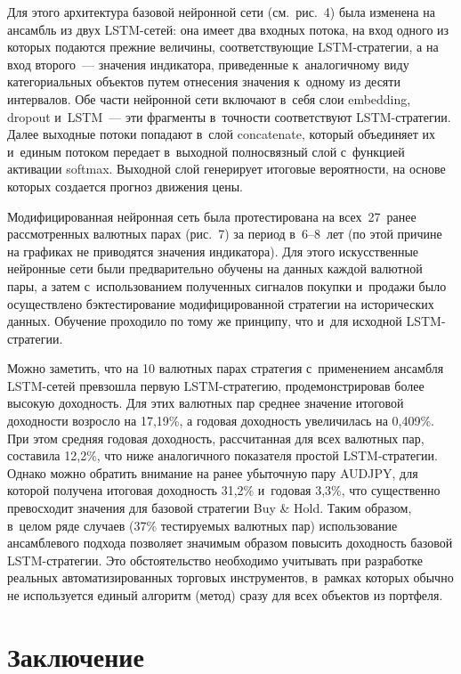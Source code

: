 {\begin{multicols}{2}
  
  Для этого архитектура базовой нейронной сети (см.\ рис.~4) была изменена на ансамбль из 
двух LSTM-се\-тей: она имеет два входных потока, на вход одного из которых подаются 
прежние величины, соответствующие LSTM-стра\-те\-гии, а на вход второго~--- значения 
индикатора, приведенные к~аналогичному виду категориальных объектов путем отнесения 
значения к~одному из десяти интервалов. Обе части нейронной сети включают в~себя слои 
embedding, dropout и~LSTM~--- эти фрагменты в~точности соответствуют LSTM-стра\-те\-гии. 
Далее выходные потоки попадают в~слой concatenate, который объединяет их и~единым 
потоком передает в~выходной полносвязный слой с~функцией активации softmax. Выходной 
слой генерирует итоговые вероятности, на основе которых создается прогноз движения 
\mbox{цены.}
  
  Модифицированная нейронная сеть была протестирована на всех~27~ранее 
рассмотренных валютных парах (рис.~7) за период в~6--8~лет (по этой причине на 
графиках не приводятся значения индикатора). Для этого искусственные нейронные сети 
были предварительно обучены на данных каждой валютной пары, а затем с~использованием 
полученных сигналов покупки и~продажи было осуществлено бэктестирование 
модифицированной стратегии на исторических данных. Обучение проходило по тому же 
принципу, что и~для исходной LSTM-стра\-те\-гии. 
  
  Можно заметить, что на 10 валютных парах стратегия с~применением ансамбля 
 LSTM-се\-тей превзошла первую LSTM-стра\-те\-гию, продемонстрировав более высокую 
доходность. Для этих валютных пар среднее значение итоговой доходности воз\-рос\-ло на 
17,19\%, а годовая доходность увеличилась на 0,409\%. При этом средняя годовая 
доходность, рассчитанная для всех валютных пар, составила 12,2\%, что ниже аналогичного 
показателя простой LSTM-стра\-те\-гии. Однако можно обратить внимание на ранее 
убыточную пару AUDJPY, для которой получена итоговая доходность 31,2\% и~годовая 
3,3\%, что существенно превосходит значения для базовой стратегии Buy \& Hold. Таким 
образом, в~целом ряде случаев (37\% тестируемых валютных пар) использование 
ансамблевого подхода позволяет значимым образом повысить доходность базовой  
LSTM-стра\-те\-гии. Это обстоятельство необходимо учитывать при разработке реальных 
автоматизированных торговых инструментов, в~рамках которых обычно не используется 
единый алгоритм (метод) сразу для всех объектов из портфеля.

 \vspace*{-9pt}

\section{Заключение}


\end{multicols}}
